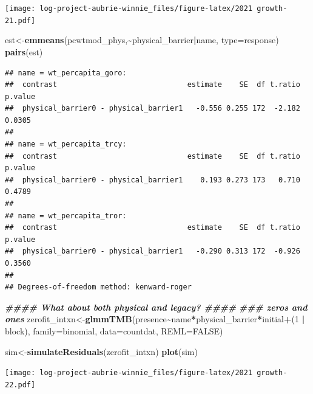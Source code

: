 \documentclass[
]{article}
\newenvironment{Shaded}{\begin{snugshade}}{\end{snugshade}}
\newcommand{\AttributeTok}[1]{\textcolor[rgb]{0.13,0.29,0.53}{#1}}
\newcommand{\ConstantTok}[1]{\textcolor[rgb]{0.56,0.35,0.01}{#1}}
\newcommand{\DecValTok}[1]{\textcolor[rgb]{0.00,0.00,0.81}{#1}}
\newcommand{\DocumentationTok}[1]{\textcolor[rgb]{0.56,0.35,0.01}{\textbf{\textit{#1}}}}
\newcommand{\FunctionTok}[1]{\textcolor[rgb]{0.13,0.29,0.53}{\textbf{#1}}}
\newcommand{\NormalTok}[1]{#1}
\newcommand{\OtherTok}[1]{\textcolor[rgb]{0.56,0.35,0.01}{#1}}
\newcommand{\SpecialCharTok}[1]{\textcolor[rgb]{0.81,0.36,0.00}{\textbf{#1}}}
\newcommand{\StringTok}[1]{\textcolor[rgb]{0.31,0.60,0.02}{#1}}
\begin{document}
\texttt{[image: log-project-aubrie-winnie\_files/figure-latex/2021 growth-21.pdf]}

\begin{Shaded}
\begin{Highlighting}[]
\NormalTok{est}\OtherTok{\textless{}{-}}\FunctionTok{emmeans}\NormalTok{(pcwtmod\_phys,}\SpecialCharTok{\textasciitilde{}}\NormalTok{physical\_barrier}\SpecialCharTok{|}\NormalTok{name, }\AttributeTok{type=}\StringTok{\textquotesingle{}response\textquotesingle{}}\NormalTok{)}
\FunctionTok{pairs}\NormalTok{(est)}
\end{Highlighting}
\end{Shaded}

\begin{verbatim}
## name = wt_percapita_goro:
##  contrast                              estimate    SE  df t.ratio p.value
##  physical_barrier0 - physical_barrier1   -0.556 0.255 172  -2.182  0.0305
## 
## name = wt_percapita_trcy:
##  contrast                              estimate    SE  df t.ratio p.value
##  physical_barrier0 - physical_barrier1    0.193 0.273 173   0.710  0.4789
## 
## name = wt_percapita_tror:
##  contrast                              estimate    SE  df t.ratio p.value
##  physical_barrier0 - physical_barrier1   -0.290 0.313 172  -0.926  0.3560
## 
## Degrees-of-freedom method: kenward-roger
\end{verbatim}

\begin{Shaded}
\begin{Highlighting}[]
\DocumentationTok{\#\#\#\# What about both physical and legacy? \#\#\#\# }
\DocumentationTok{\#\#\# zeros and ones }
\NormalTok{zerofit\_intxn}\OtherTok{\textless{}{-}}\FunctionTok{glmmTMB}\NormalTok{(presence}\SpecialCharTok{\textasciitilde{}}\NormalTok{name}\SpecialCharTok{*}\NormalTok{physical\_barrier}\SpecialCharTok{*}\NormalTok{initial}\SpecialCharTok{+}\NormalTok{(}\DecValTok{1} \SpecialCharTok{|}\NormalTok{ block), }\AttributeTok{family=}\NormalTok{binomial, }\AttributeTok{data=}\NormalTok{countdat, }\AttributeTok{REML=}\ConstantTok{FALSE}\NormalTok{)}

\NormalTok{sim}\OtherTok{\textless{}{-}}\FunctionTok{simulateResiduals}\NormalTok{(zerofit\_intxn)}
\FunctionTok{plot}\NormalTok{(sim)}
\end{Highlighting}
\end{Shaded}

\texttt{[image: log-project-aubrie-winnie\_files/figure-latex/2021 growth-22.pdf]}
\end{document}
